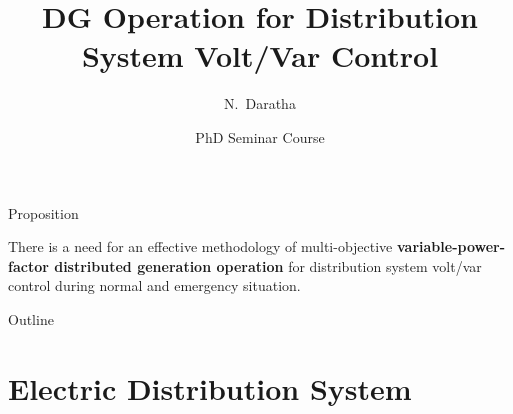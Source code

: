 \documentclass[10pt]{beamer}
\title[ DG participation in DS control] %
{DG Operation for Distribution System  Volt/Var Control}
\subtitle
{} %
\author[N. Daratha] %
{N.~Daratha }
\institute[IIT Roorkee] %
{

guided by \\ \vspace{.10cm}Prof. J.D. Sharma and Prof. B. Das\\
\vspace{.10cm}  Department of Electrical Engineering\\
IIT Roorkee
}
\date[Short Occasion] %
{PhD Seminar Course}
\begin{document}
\def\newblock{\hskip .11em plus .33em minus .07em} %


\begin{frame}
  \titlepage
\end{frame}
\begin{frame}{Proposition}
\begin{center}
There is a need for an effective methodology of multi-objective  \textbf{variable-power-factor distributed generation operation} for distribution system volt/var control during normal and emergency situation.\\ 
\end{center}
\end{frame}



\begin{frame}{Outline}
  \tableofcontents
\end{frame}



\section{Electric Distribution System}



\end{document}
